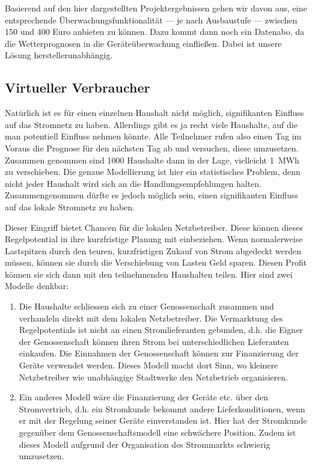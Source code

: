 \documentclass[logo]{fhgart}
\begin{document}
%
%
%
%

Basierend auf den hier dargestellten Projektergebnissen gehen wir davon
aus, eine entsprechende Überwachungsfunktionalität --- je nach Ausbaustufe ---
zwischen 150 und 400 Euro anbieten zu können. Dazu kommt dann noch ein
Datenabo, da die Wetterprognosen in die Geräteüberwachung einfließen.
Dabei ist unsere Lösung herstellerunabhängig.

\subsection{Virtueller Verbraucher}\label{sub:virtuellerverbraucher}
Natürlich ist es für einen einzelnen Haushalt nicht möglich,
signifikanten Einfluss auf das Stromnetz zu haben. Allerdings gibt es ja
recht viele Haushalte, auf die man potentiell Einfluss nehmen könnte.
Alle Teilnehmer rufen also einen Tag im Voraus die Prognose für den
nächsten Tag ab und versuchen, diese umzusetzen. Zusammen genommen sind
1000 Haushalte dann in der Lage, vielleicht 1~MWh zu verschieben.  Die
genaue Modellierung ist hier ein statistisches Problem, denn nicht jeder
Haushalt wird sich an die Handlungsempfehlungen halten. Zusammengenommen
dürfte es jedoch möglich sein, einen signifikanten Einfluss auf das
lokale Stromnetz zu haben.

Dieser Eingriff bietet Chancen für die lokalen Netzbetreiber. Diese
können dieses Regelpotential in ihre kurzfristige Planung mit
einbeziehen. Wenn normalerweise Lastspitzen durch den teuren,
kurzfristigen Zukauf von Strom abgedeckt werden müssen, können sie durch
die Verschiebung von Lasten Geld sparen. Diesen Profit können sie sich
dann mit den teilnehmenden Haushalten teilen. Hier sind zwei Modelle denkbar: 
\begin{enumerate}
  \item Die Haushalte schliessen sich zu einer Genossenschaft zusammen
    und verhandeln direkt mit dem lokalen Netzbetreiber. Die Vermarktung
    des Regelpotentials ist nicht an einen Stromlieferanten gebunden,
    d.h. die Eigner der Genossenschaft können ihren Strom bei
    unterschiedlichen Lieferanten einkaufen. Die Einnahmen der
    Genossenschaft können zur Finanzierung der Geräte verwendet werden.
    Dieses Modell macht dort Sinn, wo kleinere Netzbetreiber wie
    unabhängige Stadtwerke den Netzbetrieb organisieren.
  \item Ein anderes Modell wäre die Finanzierung der Geräte etc. über
    den Stromvertrieb, d.h. ein Stromkunde bekommt andere
    Lieferkonditionen, wenn er mit der Regelung seiner Geräte
    einverstanden ist. Hier hat der Stromkunde gegenüber dem
    Genossenschaftsmodell eine schwächere Position. Zudem ist dieses
    Modell aufgrund der Organisation des Strommarkts schwierig
    umzusetzen.
\end{enumerate}
\end{document}
